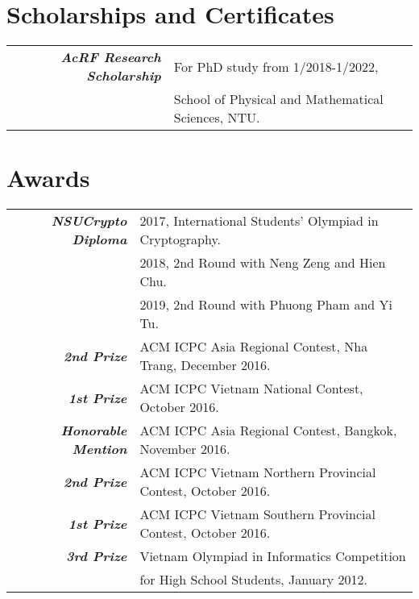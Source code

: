 \documentclass[a4paper, 11pt]{article}
\begin{document}
	
	\section{Scholarships and Certificates}	
	\begin{tabular}{rl}
		{\sl \textbf{AcRF Research Scholarship}} & For PhD study from 1/2018-1/2022, \\
		& School of Physical and Mathematical Sciences, NTU.\\
	\end{tabular}
	
	
	
	\section{Awards}
	\begin{tabular}{rl}
		{\sl \textbf{NSUCrypto Diploma}}& 2017, International Students' Olympiad in Cryptography.\\
		{}& 2018, 2nd Round with Neng Zeng and Hien Chu.\\
		{}& 2019, 2nd Round with Phuong Pham and Yi Tu.\\
		{\sl \textbf{2nd Prize}}& ACM ICPC Asia Regional Contest, Nha Trang, December 2016.\\
		{\sl \textbf{1st Prize}}& ACM ICPC Vietnam National Contest, October 2016.\\
		{\sl \textbf{Honorable Mention}}& ACM ICPC Asia Regional Contest, Bangkok, November 2016.\\
		{\sl \textbf{2nd Prize}}& ACM ICPC Vietnam Northern Provincial Contest, October 2016.\\
		{\sl \textbf{1st Prize}}& ACM ICPC Vietnam Southern Provincial Contest, October 2016.\\
		{\sl \textbf{3rd Prize}}& Vietnam Olympiad in Informatics Competition\\& for High School Students, January 2012.
	\end{tabular}
	
\end{document}

